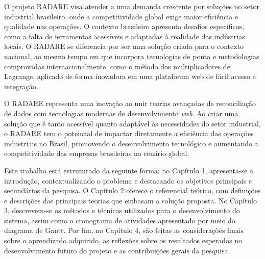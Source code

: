 O projeto RADARE visa atender a uma demanda crescente por soluções no setor industrial brasileiro, onde a competitividade global exige maior eficiência e qualidade nas operações. O contexto brasileiro apresenta desafios específicos, como a falta de ferramentas acessíveis e adaptadas à realidade das indústrias locais. O RADARE se diferencia por ser uma solução criada para o contexto nacional, ao mesmo tempo em que incorpora tecnologias de ponta e metodologias comprovadas internacionalmente, como o método dos multiplicadores de Lagrange, aplicado de forma inovadora em uma plataforma web de fácil acesso e integração.

O RADARE representa uma inovação ao unir teorias avançadas de reconciliação de dados com tecnologias modernas de desenvolvimento \textit{web}. Ao criar uma solução que é tanto acessível quanto adaptável às necessidades do setor industrial, o RADARE tem o potencial de impactar diretamente a eficiência das operações industriais no Brasil, promovendo o desenvolvimento tecnológico e aumentando a competitividade das empresas brasileiras no cenário global.

Este trabalho está estruturado da seguinte forma: no Capítulo 1, apresenta-se a introdução, contextualizando o problema e destacando os objetivos principais e secundários da pesquisa. O Capítulo 2 oferece o referencial teórico, com definições e descrições das principais teorias que embasam a solução proposta. No Capítulo 3, descrevem-se os métodos e técnicas utilizados para o desenvolvimento do sistema, assim como o cronograma de atividades apresentado por meio do diagrama de Gantt. Por fim, no Capítulo 4, são feitas as considerações finais sobre o aprendizado adquirido, as reflexões sobre os resultados esperados no desenvolvimento futuro do projeto e as contribuições gerais da pesquisa.
